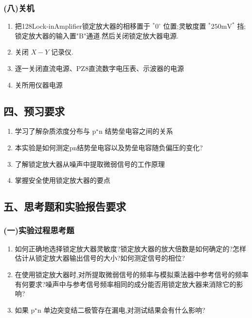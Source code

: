 \documentclass[12pt,a4paper]{article}
\begin{document}
\subsubsection*{(八)关机}
\begin{enumerate}
    \item 把128Lock-inAmplifier锁定放大器的相移置于 \(^{\ast}0^{\circ}\) 位置;灵敏度置 \(^{\ast}250\mathrm{mV}^{\ast}\) 挡;锁定放大器的输入置"B"通道.然后关闭锁定放大器电源.
    \item 关闭 \(X - Y\) 记录仪.
    \item 逐一关闭直流电源、PZ8直流数字电压表、示波器的电源
    \item 关所用仪器电源
\end{enumerate}

\subsection*{四、预习要求}

\begin{enumerate}
    \item 学习了解杂质浓度分布与 \(\mathrm{p}^{\star}\mathrm{n}\) 结势垒电容之间的关系
    \item 本实验是如何测定pn结势垒电容以及势垒电容随负偏压的变化?
    \item 了解锁定放大器从噪声中提取微弱信号的工作原理
    \item 掌握安全使用锁定放大器的要点
\end{enumerate}

\subsection*{五、思考题和实验报告要求}

\subsubsection*{(一)实验过程思考题}
\begin{enumerate}
    \item 如何正确地选择锁定放大器灵敏度?锁定放大器的放大倍数是如何确定的?怎样估计从锁定放大器输出信号的大小?如何测定信号的相位?
    \item 在使用锁定放大器时,对所提取微弱信号的频率与模拟乘法器中参考信号的频率有何要求?噪声中与参考信号频率相同的成分能否用锁定放大器来消除它的影响?
    \item 如果 \(\mathrm{p}^{\star}\mathrm{n}\) 单边突变结二极管存在漏电,对测试结果会有什么影响?
\end{enumerate}
\end{document}
